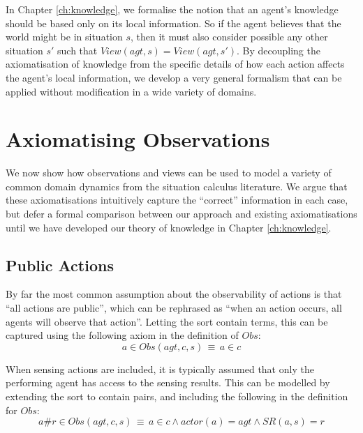 In Chapter \ref{ch:knowledge}, we formalise the notion that an agent's
knowledge should be based only on its local information. So if the
agent believes that the world might be in situation $s$, then it
must also consider possible any other situation $s'$ such that $View(agt,s)=View(agt,s')$.
By decoupling the axiomatisation of knowledge from the specific details
of how each action affects the agent's local information, we develop
a very general formalism that can be applied without modification
in a wide variety of domains.


\section{Axiomatising Observations\label{sec:Observations:Axiomatising-simple}}

We now show how observations and views can be used to model a variety
of common domain dynamics from the situation calculus literature.
We argue that these axiomatisations intuitively capture the {}``correct''
information in each case, but defer a formal comparison between our
approach and existing axiomatisations until we have developed our
theory of knowledge in Chapter \ref{ch:knowledge}.


\subsection{Public Actions}

By far the most common assumption about the observability of actions
is that {}``all actions are public'', which can be rephrased as
{}``when an action occurs, all agents will observe that action''.
Letting the sort contain terms, this
can be captured using the following axiom in the definition of $Obs$:\begin{equation}
a\in Obs(agt,c,s)\,\equiv\, a\in c\label{eq:Observations:ObsStd1}\end{equation}


When sensing actions are included, it is typically assumed that only
the performing agent has access to the sensing results. This can be
modelled by extending the  sort to contain 
pairs, and including the following in the definition for $Obs$:\begin{equation}
a\#r\in Obs(agt,c,s)\,\equiv\, a\in c\wedge actor(a)=agt\wedge SR(a,s)=r\label{eq:Observations:ObsStd2}\end{equation}


